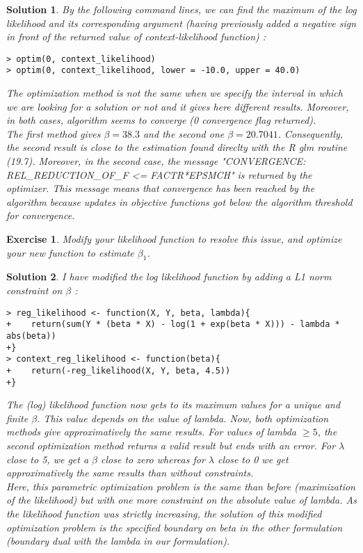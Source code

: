 \documentclass[12pt,a4paper]{article}
\newtheorem{exercise}{Exercise}
\newtheorem{solution}{Solution}
\begin{document}
\begin{solution}
By the following command lines, we can find the maximum of the log likelihood and its corresponding argument (having previously added a negative sign in front of the returned value of context-likelihood function) : 

\begin{verbatim}
> optim(0, context_likelihood)
> optim(0, context_likelihood, lower = -10.0, upper = 40.0)
\end{verbatim}

The optimization method is not the same when we specify the interval in which we are looking for a solution or not and it gives here different results. Moreover, in both cases, algorithm seems to converge (0 convergence flag returned).\\

The first method gives $\beta = 38.3$ and the second one $\beta = 20.7041$. Consequently, the second result is close to the estimation found direclty with the R glm routine (19.7). Moreover, in the second case, the message "CONVERGENCE: REL\_REDUCTION\_OF\_F <= FACTR*EPSMCH" is returned by the optimizer. This message means that convergence has been reached by the algorithm because updates in objective functions got below the algorithm threshold for convergence.\\
\end{solution}

\begin{exercise}
 Modify your likelihood function to resolve this issue, and optimize your new function to estimate $\beta_1$. 
\end{exercise}
\begin{solution}
I have modified the log likelihood function by adding a L1 norm constraint on $\beta$ : 
\begin{verbatim}
> reg_likelihood <- function(X, Y, beta, lambda){
+    return(sum(Y * (beta * X) - log(1 + exp(beta * X))) - lambda * abs(beta))
+} 
> context_reg_likelihood <- function(beta){
+    return(-reg_likelihood(X, Y, beta, 4.5))
+} 
\end{verbatim}

The (log) likelihood function now gets to its maximum values for a unique and finite $\beta$. This value depends on the value of lambda. Now, both optimization methods give approximatively the same results. For values of lambda $\geq 5$, the second optimization method returns a valid result but ends with an error. For $\lambda$ close to 5, we get a $\beta$ close to zero whereas for $\lambda$ close to 0 we get approximatively the same results than without constraints.\\

Here, this parametric optimization problem is the same than before (maximization of the likelihood) but with one more constraint on the absolute value of lambda. As the likelihood function was strictly increasing, the solution of this modified optimization problem is the specified boundary on beta in the other formulation (boundary dual with the lambda in our formulation).\\
\end{solution}
\end{document}
